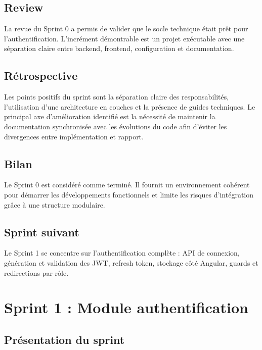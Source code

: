 \documentclass[12pt,a4paper]{report}
\begin{document}
\section{Review}

La revue du Sprint 0 a permis de valider que le socle technique était prêt pour l'authentification. L'incrément démontrable est un projet exécutable avec une séparation claire entre backend, frontend, configuration et documentation.

\section{Rétrospective}

Les points positifs du sprint sont la séparation claire des responsabilités, l'utilisation d'une architecture en couches et la présence de guides techniques. Le principal axe d'amélioration identifié est la nécessité de maintenir la documentation synchronisée avec les évolutions du code afin d'éviter les divergences entre implémentation et rapport.

\section{Bilan}

Le Sprint 0 est considéré comme terminé. Il fournit un environnement cohérent pour démarrer les développements fonctionnels et limite les risques d'intégration grâce à une structure modulaire.

\section{Sprint suivant}

Le Sprint 1 se concentre sur l'authentification complète : API de connexion, génération et validation des JWT, refresh token, stockage côté Angular, guards et redirections par rôle.

\chapter{Sprint 1 : Module authentification}

\section{Présentation du sprint}
\end{document}
